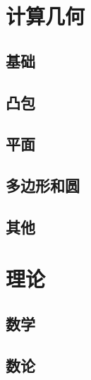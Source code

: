 \documentclass[12pt,a4paper,titlepage]{article}
\begin{document}
\section{\LARGE 计算几何}
	\subsection{基础}

	\subsection{凸包}

	\subsection{平面}

	\subsection{多边形和圆}

	\subsection{其他}

\section{\LARGE 理论}
	\subsection{数学}

	\subsection{数论}
\end{document}
